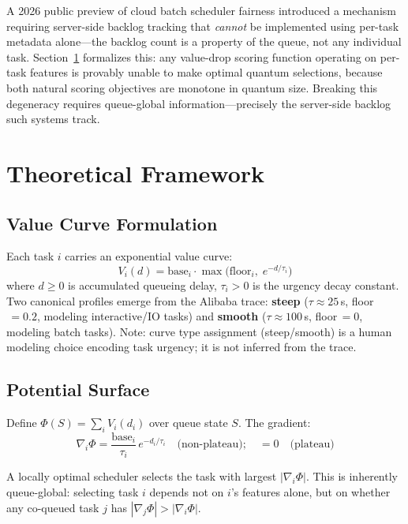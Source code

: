 \documentclass[10pt,twocolumn]{article}
\theoremstyle{remark}
\begin{document}
A 2026 public preview of cloud batch scheduler fairness introduced a
mechanism requiring server-side backlog tracking that \emph{cannot}
be implemented using per-task metadata alone---the backlog count is a
property of the queue, not any individual task. Section~\ref{sec:theory}
formalizes this: any value-drop scoring function operating on per-task
features is provably unable to make optimal quantum selections, because
both natural scoring objectives are monotone in quantum size. Breaking
this degeneracy requires queue-global information---precisely the
server-side backlog such systems track.

\section{Theoretical Framework}
\label{sec:theory}

\subsection{Value Curve Formulation}

Each task $i$ carries an exponential value curve:
\begin{equation}
  V_i(d) = \mathrm{base}_i \cdot
  \max\!\bigl(\mathrm{floor}_i,\; e^{-d/\tau_i}\bigr)
  \label{eq:vcurve}
\end{equation}
where $d \geq 0$ is accumulated queueing delay, $\tau_i > 0$ is the
urgency decay constant. Two canonical profiles emerge from the Alibaba
trace: \textbf{steep} ($\tau \approx 25$\,s, floor$\,=0.2$, modeling
interactive/IO tasks) and \textbf{smooth} ($\tau \approx 100$\,s,
floor$\,=0$, modeling batch tasks). Note: curve type assignment
(steep/smooth) is a human modeling choice encoding task urgency; it
is not inferred from the trace.

\subsection{Potential Surface}

Define $\Phi(S) = \sum_i V_i(d_i)$ over queue state $S$. The gradient:
\begin{equation}
  \nabla_i \Phi = \frac{\mathrm{base}_i}{\tau_i}\,e^{-d_i/\tau_i}
  \quad\text{(non-plateau)}; \quad = 0 \quad\text{(plateau)}
\end{equation}

A locally optimal scheduler selects the task with largest
$|\nabla_i\Phi|$. This is inherently queue-global: selecting task $i$
depends not on $i$'s features alone, but on whether any co-queued task
$j$ has $|\nabla_j\Phi| > |\nabla_i\Phi|$.
\end{document}
